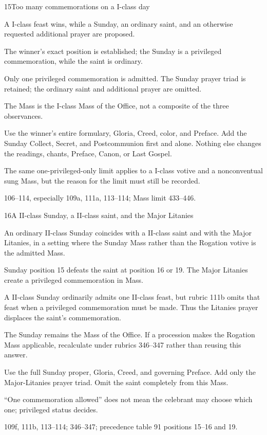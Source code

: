 \begin{casefile}{15}{Too many commemorations on a I-class day}
\item[Calendar facts] A I-class feast wins, while a Sunday, an ordinary saint, and an otherwise requested additional prayer are proposed.
\item[Ranks and rows] The winner's exact position is established; the Sunday is a privileged commemoration, while the saint is ordinary.
\item[Impeded item] Only one privileged commemoration is admitted.  The Sunday prayer triad is retained; the ordinary saint and additional prayer are omitted.
\item[Mass category] The Mass is the I-class Mass of the Office, not a composite of the three observances.
\item[Assembly] Use the winner's entire formulary, Gloria, Creed, color, and Preface.  Add the Sunday Collect, Secret, and Postcommunion first and alone.  Nothing else changes the readings, chants, Preface, Canon, or Last Gospel.
\item[Boundary] The same one-privileged-only limit applies to a I-class votive and a nonconventual sung Mass, but the reason for the limit must still be recorded.
\item[Rubric locus] 106--114, especially 109a, 111a, 113--114; Mass limit 433--446.
\end{casefile}

\begin{casefile}{16}{A II-class Sunday, a II-class saint, and the Major Litanies}
\item[Calendar facts] An ordinary II-class Sunday coincides with a II-class saint and with the Major Litanies, in a setting where the Sunday Mass rather than the Rogation votive is the admitted Mass.
\item[Ranks and rows] Sunday position 15 defeats the saint at position 16 or 19.  The Major Litanies create a privileged commemoration in Mass.
\item[Impeded item] A II-class Sunday ordinarily admits one II-class feast, but rubric 111b omits that feast when a privileged commemoration must be made.  Thus the Litanies prayer displaces the saint's commemoration.
\item[Mass category] The Sunday remains the Mass of the Office.  If a procession makes the Rogation Mass applicable, recalculate under rubrics 346--347 rather than reusing this answer.
\item[Assembly] Use the full Sunday proper, Gloria, Creed, and governing Preface.  Add only the Major-Litanies prayer triad.  Omit the saint completely from this Mass.
\item[Boundary] “One commemoration allowed” does not mean the celebrant may choose which one; privileged status decides.
\item[Rubric locus] 109f, 111b, 113--114; 346--347; precedence table 91 positions 15--16 and 19.
\end{casefile}

